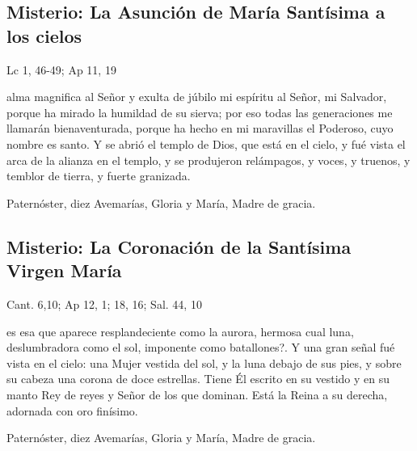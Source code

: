 \documentclass[10pt,a4paper,oneside]{book}
\newcounter{glorious-counter}
\begin{document}
\subsection*{ Misterio: La Asunción de María Santísima a los cielos}
\begin{flushright}
      {\color{red}Lc 1, 46-49; Ap 11, 19}
\end{flushright}
 alma magnifica al Señor y exulta de júbilo mi espíritu al Señor, mi Salvador, porque ha mirado la humildad de su sierva; 
por eso todas las generaciones me llamarán bienaventurada, porque ha hecho en mi maravillas el Poderoso, cuyo nombre es santo. Y se abrió el templo de Dios, que está en el cielo, 
y fué vista el arca de la alianza en el templo, y se produjeron relámpagos, y voces, y truenos, y temblor de tierra, y fuerte granizada.

\begin{center}
      Paternóster, diez Avemarías, Gloria y María, Madre de gracia.
\end{center}

\subsection*{ Misterio: La Coronación de la Santísima Virgen María}
\begin{flushright}
      {\color{red}Cant. 6,10; Ap 12, 1; 18, 16; Sal. 44, 10}
\end{flushright}
 es esa que aparece resplandeciente como la aurora, hermosa cual luna, deslumbradora como el sol, imponente como batallones?. 
Y una gran señal fué vista en el cielo: una Mujer vestida del sol, y la luna debajo de sus  pies, y sobre su cabeza una corona de doce estrellas. 
Tiene Él escrito en su vestido y en su manto Rey de reyes y Señor de los que dominan. Está la Reina a su derecha, adornada con oro finísimo.

\begin{center}
      Paternóster, diez Avemarías, Gloria y María, Madre de gracia.
\end{center}
\bigskip

\label{final-prayer}
\begin{center}
\end{center}
\end{document}
